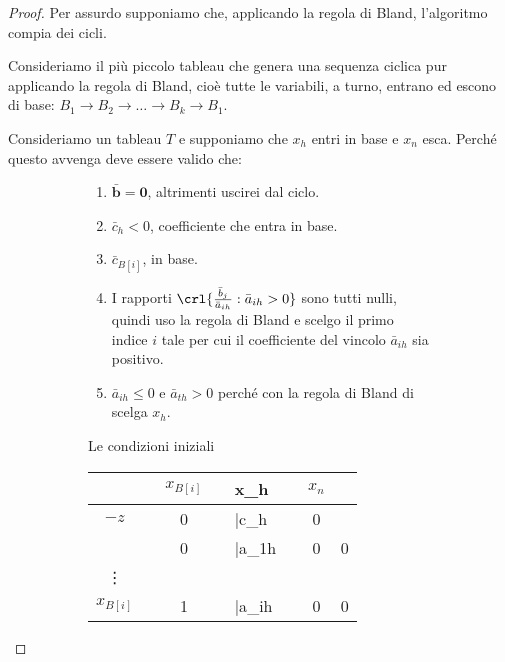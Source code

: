 \documentclass[\main/main.tex]{subfiles}
\begin{document}
\begin{proof}
  Per assurdo supponiamo che, applicando la regola di Bland, l'algoritmo compia dei cicli.

  Consideriamo il più piccolo tableau che genera una sequenza ciclica pur applicando la regola di Bland, cioè tutte le variabili, a turno, entrano ed escono di base: $B_1 \rightarrow B_2 \rightarrow \ldots \rightarrow B_k \rightarrow B_1$.

  Consideriamo un tableau $T$ e supponiamo che $x_h$ entri in base e $x_n$ esca. Perché questo avvenga deve essere valido che:

  \begin{figure}
    \begin{subfigure}{0.49\textwidth}
      \begin{enumerate}
        \item $\bar{\bm{b}} = \bm{0}$, altrimenti uscirei dal ciclo.
        \item $\bar{c}_h < 0$, coefficiente che entra in base.
        \item $\bar{c}_{B[i]}$, in base.
        \item I rapporti $\crl{\frac{\bar{b}_j}{\bar{a}_{ih}}:\bar{a}_{ih}>0}$ sono tutti nulli, quindi uso la regola di Bland e scelgo il primo indice $i$ tale per cui il coefficiente del vincolo $\bar{a}_{ih}$ sia positivo.
        \item $\bar{a}_{ih} \leq 0$ e  $\bar{a}_{th} > 0$ perché con la regola di Bland di scelga $x_h$.
      \end{enumerate}
      \caption{Le condizioni iniziali}
    \end{subfigure}
    \begin{subfigure}{0.49\textwidth}
      \begin{table}
        \begin{tabular}{c|LcLLLc|L}
                       &  & $x_{B[i]}$ &  & x_h          &  & $x_n$ &   \\
          \hline
          $-z$         &  & 0          &  & \bar{c}_h    &  & 0     &   \\
          \hline

                       &  & 0          &  & \bar{a}_{1h} &  & 0     & 0 \\

          \vdots       &  &            &  &              &  &       &   \\

          $x_{B[i]}$   &  & 1          &  & \bar{a}_{ih} &  & 0     & 0 \\


\end{tabular}
\end{table}
\end{subfigure}
\end{figure}
\end{proof}
\end{document}
